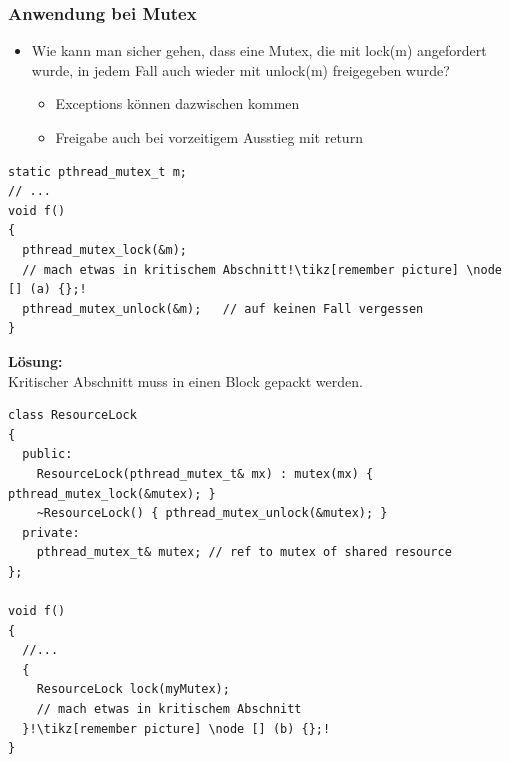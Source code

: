 \subsubsection{Anwendung bei Mutex}
\begin{itemize}
  \item Wie kann man sicher gehen, dass eine Mutex, die mit lock(m) angefordert wurde, in jedem Fall auch wieder mit unlock(m) freigegeben wurde?
  \begin{itemize}
    \item Exceptions können dazwischen kommen
    \item Freigabe auch bei vorzeitigem Ausstieg mit return
  \end{itemize}
\end{itemize}
\begin{lstlisting}[style=C,escapechar=!]
static pthread_mutex_t m;
// ...
void f()
{
  pthread_mutex_lock(&m);
  // mach etwas in kritischem Abschnitt!\tikz[remember picture] \node [] (a) {};!
  pthread_mutex_unlock(&m);   // auf keinen Fall vergessen
}
\end{lstlisting}
\textbf{Lösung:}\\
Kritischer Abschnitt muss in einen Block gepackt werden.
\begin{lstlisting}[style=C,escapechar=!]
class ResourceLock
{
  public:
    ResourceLock(pthread_mutex_t& mx) : mutex(mx) { pthread_mutex_lock(&mutex); }
    ~ResourceLock() { pthread_mutex_unlock(&mutex); }
  private:
    pthread_mutex_t& mutex; // ref to mutex of shared resource
};

void f()
{
  //...
  {
    ResourceLock lock(myMutex);
    // mach etwas in kritischem Abschnitt
  }!\tikz[remember picture] \node [] (b) {};!
}
\end{lstlisting}
